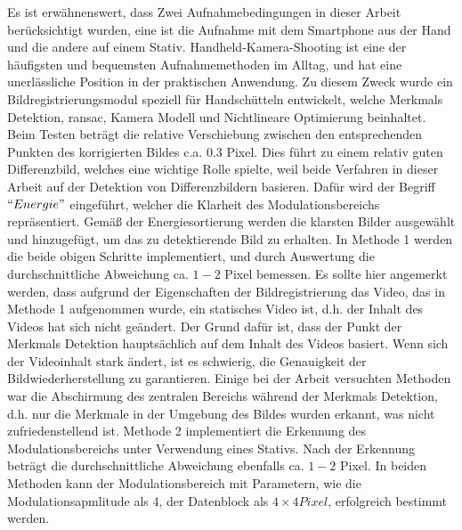 Es ist erwähnenswert, dass Zwei Aufnahmebedingungen in dieser Arbeit berücksichtigt wurden, eine ist die Aufnahme mit dem Smartphone aus der Hand und die andere auf einem Stativ. Handheld-Kamera-Shooting ist eine der häufigsten und bequemsten Aufnahmemethoden im Alltag, und hat eine unerlässliche Position in der praktischen Anwendung. Zu diesem Zweck wurde ein Bildregistrierungsmodul speziell für Handschütteln entwickelt, welche Merkmals Detektion, \gls{ransac}, Kamera Modell und Nichtlineare Optimierung beinhaltet. Beim Testen beträgt die relative Verschiebung zwischen den entsprechenden Punkten des korrigierten Bildes c.a. 0.3 Pixel. Dies führt zu einem relativ guten Differenzbild, welches eine wichtige Rolle spielte, weil beide Verfahren in dieser Arbeit auf der Detektion von Differenzbildern basieren. Dafür wird der Begriff $ ``Energie" $ eingeführt, welcher die Klarheit des Modulationsbereichs repräsentiert. Gemäß der Energiesortierung werden die klarsten Bilder ausgewählt und hinzugefügt, um das zu detektierende Bild zu erhalten. In Methode 1 werden die beide obigen Schritte implementiert, und durch Auswertung die durchschnittliche Abweichung ca. $ 1-2 $ Pixel bemessen. Es sollte hier angemerkt werden, dass aufgrund der Eigenschaften der Bildregistrierung das Video, das in Methode 1 aufgenommen wurde, ein statisches Video ist, d.h. der Inhalt des Videos hat sich nicht geändert. Der Grund dafür ist, dass der Punkt der Merkmals Detektion hauptsächlich auf dem Inhalt des Videos basiert. Wenn sich der Videoinhalt stark ändert, ist es schwierig, die Genauigkeit der Bildwiederherstellung zu garantieren. Einige bei der Arbeit versuchten Methoden war die Abschirmung des zentralen Bereichs während der Merkmals Detektion, d.h. nur die Merkmale in der Umgebung des Bildes wurden erkannt, was nicht zufriedenstellend ist. Methode 2 implementiert die Erkennung des Modulationsbereichs unter Verwendung eines Stativs. Nach der Erkennung beträgt die durchschnittliche Abweichung ebenfalls ca. $ 1-2 $ Pixel. In beiden Methoden kann der Modulationsbereich mit Parametern, wie die Modulationsapmlitude als 4, der Datenblock als $ 4 \times 4 Pixel$, erfolgreich bestimmt werden. 

